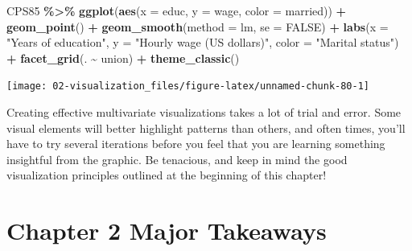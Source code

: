\documentclass[
]{book}
\newenvironment{Shaded}{\begin{snugshade}}{\end{snugshade}}
\newcommand{\AttributeTok}[1]{\textcolor[rgb]{0.13,0.29,0.53}{#1}}
\newcommand{\ConstantTok}[1]{\textcolor[rgb]{0.56,0.35,0.01}{#1}}
\newcommand{\FunctionTok}[1]{\textcolor[rgb]{0.13,0.29,0.53}{\textbf{#1}}}
\newcommand{\NormalTok}[1]{#1}
\newcommand{\SpecialCharTok}[1]{\textcolor[rgb]{0.81,0.36,0.00}{\textbf{#1}}}
\newcommand{\StringTok}[1]{\textcolor[rgb]{0.31,0.60,0.02}{#1}}
\begin{document}
\begin{Shaded}
\begin{Highlighting}[]
\NormalTok{CPS85 }\SpecialCharTok{\%\textgreater{}\%}
    \FunctionTok{ggplot}\NormalTok{(}\FunctionTok{aes}\NormalTok{(}\AttributeTok{x =}\NormalTok{ educ, }\AttributeTok{y =}\NormalTok{ wage, }\AttributeTok{color =}\NormalTok{ married)) }\SpecialCharTok{+}
    \FunctionTok{geom\_point}\NormalTok{() }\SpecialCharTok{+}
    \FunctionTok{geom\_smooth}\NormalTok{(}\AttributeTok{method =} \StringTok{\textquotesingle{}lm\textquotesingle{}}\NormalTok{, }\AttributeTok{se =} \ConstantTok{FALSE}\NormalTok{) }\SpecialCharTok{+}
    \FunctionTok{labs}\NormalTok{(}\AttributeTok{x =} \StringTok{"Years of education"}\NormalTok{, }\AttributeTok{y =} \StringTok{"Hourly wage (US dollars)"}\NormalTok{, }\AttributeTok{color =} \StringTok{"Marital status"}\NormalTok{) }\SpecialCharTok{+}
    \FunctionTok{facet\_grid}\NormalTok{(. }\SpecialCharTok{\textasciitilde{}}\NormalTok{ union) }\SpecialCharTok{+} 
    \FunctionTok{theme\_classic}\NormalTok{()}
\end{Highlighting}
\end{Shaded}

\begin{center}\texttt{[image: 02-visualization\_files/figure-latex/unnamed-chunk-80-1]} \end{center}

Creating effective multivariate visualizations takes a lot of trial and error. Some visual elements will better highlight patterns than others, and often times, you'll have to try several iterations before you feel that you are learning something insightful from the graphic. Be tenacious, and keep in mind the good visualization principles outlined at the beginning of this chapter!

\section{Chapter 2 Major Takeaways}\label{chapter-2-major-takeaways}
\end{document}

